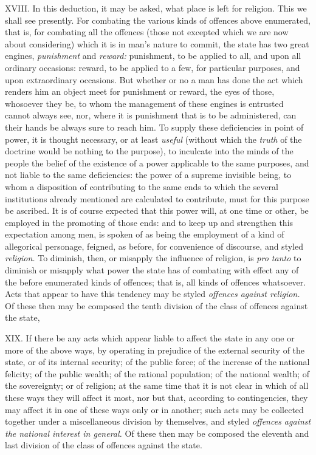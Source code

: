 \documentclass[12pt]{report}
\begin{document}
XVIII. In this deduction, it may be asked, what place is left for
religion. This we shall see presently. For combating the various kinds
of offences above enumerated, that is, for combating all the offences
(those not excepted which we are now about considering) which it is in
man's nature to commit, the state has two great engines,
\emph{punishment} and \emph{reward:} punishment, to be applied to all,
and upon all ordinary occasions: reward, to be applied to a few, for
particular purposes, and upon extraordinary occasions. But whether or no
a man has done the act which renders him an object meet for punishment
or reward, the eyes of those, whosoever they be, to whom the management
of these engines is entrusted cannot always see, nor, where it is
punishment that is to be administered, can their hands be always sure to
reach him. To supply these deficiencies in point of power, it is thought
necessary, or at least \emph{useful} (without which the \emph{truth} of
the doctrine would be nothing to the purpose), to inculcate into the
minds of the people the belief of the existence of a power applicable to
the same purposes, and not liable to the same deficiencies: the power of
a supreme invisible being, to whom a disposition of contributing to the
same ends to which the several institutions already mentioned are
calculated to contribute, must for this purpose be ascribed. It is of
course expected that this power will, at one time or other, be employed
in the promoting of those ends: and to keep up and strengthen this
expectation among men, is spoken of as being the employment of a kind of
allegorical personage, feigned, as before, for convenience of discourse,
and styled \emph{religion.} To diminish, then, or misapply the influence
of religion, is \emph{pro tanto} to diminish or misapply what power the
state has of combating with effect any of the before enumerated kinds of
offences; that is, all kinds of offences whatsoever. Acts that appear to
have this tendency may be styled \emph{offences against religion.} Of
these then may be composed the tenth division of the class of offences
against the state,

XIX. If there be any acts which appear liable to affect the state in any
one or more of the above ways, by operating in prejudice of the external
security of the state, or of its internal security; of the public force;
of the increase of the national felicity; of the public wealth; of the
rational population; of the national wealth; of the sovereignty; or of
religion; at the same time that it is not clear in which of all these
ways they will affect it most, nor but that, according to contingencies,
they may affect it in one of these ways only or in another; such acts
may be collected together under a miscellaneous division by themselves,
and styled \emph{offences against the national interest in general.} Of
these then may be composed the eleventh and last division of the class
of offences against the state.
\end{document}
